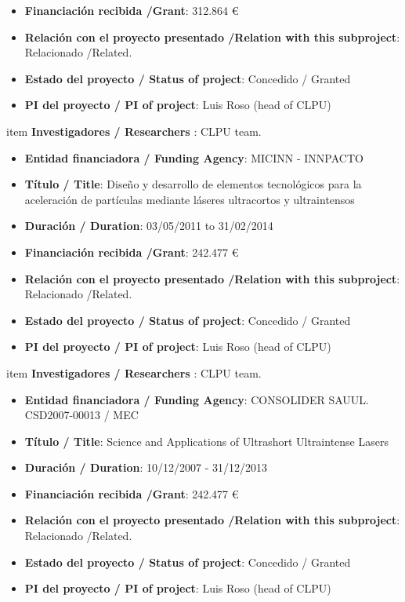 \begin{enumerate}
\begin{itemize}
\item {\bf Financiación recibida /Grant}: 312.864 \euro  
\item {\bf Relación con el proyecto presentado /Relation with this subproject}: Relacionado /Related. 
\item {\bf Estado del proyecto / Status of project}: Concedido / Granted
\item {\bf PI del proyecto / PI of project}: Luis Roso (head of CLPU)
\end{itemize}
item {\bf Investigadores / Researchers }: CLPU team.
\begin{itemize}
\item {\bf Entidad financiadora / Funding Agency}: MICINN - INNPACTO  
\item {\bf Título / Title}:  Dise\~no y desarrollo de elementos tecnol\'ogicos para la aceleraci\'on de part\'iculas mediante l\'aseres ultracortos y ultraintensos
\item {\bf Duración / Duration}: 03/05/2011 to 31/02/2014
\item {\bf Financiación recibida /Grant}: 242.477 \euro  
\item {\bf Relación con el proyecto presentado /Relation with this subproject}: Relacionado /Related. 
\item {\bf Estado del proyecto / Status of project}: Concedido / Granted
\item {\bf PI del proyecto / PI of project}: Luis Roso (head of CLPU)
\end{itemize}
item {\bf Investigadores / Researchers }: CLPU team.
\begin{itemize}
\item {\bf Entidad financiadora / Funding Agency}: CONSOLIDER SAUUL.  CSD2007-00013     / MEC   
\item {\bf Título / Title}:  Science and Applications of Ultrashort Ultraintense Lasers
\item {\bf Duración / Duration}: 10/12/2007 - 31/12/2013
\item {\bf Financiación recibida /Grant}: 242.477 \euro  
\item {\bf Relación con el proyecto presentado /Relation with this subproject}: Relacionado /Related. 
\item {\bf Estado del proyecto / Status of project}: Concedido / Granted
\item {\bf PI del proyecto / PI of project}: Luis Roso (head of CLPU)
\end{itemize}
\end{enumerate}


